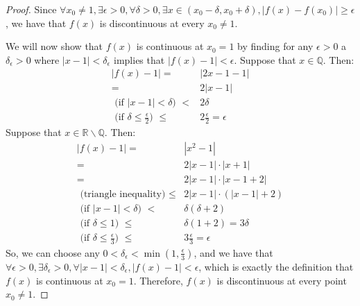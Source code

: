 \documentclass{article}
\newcommand{\reals}{\ensuremath{\mathbb{R}}}
\newcommand{\rats}{\ensuremath{\mathbb{Q}}}
\newcommand{\irats}{\ensuremath{\reals \backslash \rats}}
\newcommand{\eps}{\ensuremath{\epsilon}}
\newcommand{\pt}[1]{\textrm{ #1 }}
\begin{document}
\begin{proof}
	Since $\forall x_0 \neq 1,
	\exists \eps > 0,
	\forall \delta > 0,
	\exists x \in (x_0 - \delta, x_0 + \delta),
	|f(x) - f(x_0)| \geq \eps$,
	we have that $f(x)$
	is discontinuous
	at every $x_0 \neq 1$.

	We will now show that
	$f(x)$ is continuous at $x_0 = 1$
	by finding for any $\eps > 0$
	a $\delta_\eps > 0$
	where $|x - 1| < \delta_\eps$
	implies that $|f(x) - 1| < \eps$.
	Suppose that $x \in \rats$. Then:
	\begin{align}
		|f(x) - 1| = & |2x - 1 - 1| \\
			   = & 2|x - 1| \\
		\pt{(if $|x - 1| < \delta$)} < & 2\delta \\
		\pt{(if $\delta \le \frac{\eps}{2}$)} \le & 2 \frac{\eps}{2} = \eps
	\end{align}
	Suppose that $x \in \irats$. Then:
	\begin{align}
		|f(x) - 1| = & |x^2 - 1| \\
			   = & 2|x - 1| \cdot |x + 1| \\
			   = & 2|x - 1| \cdot |x - 1 + 2| \\
			   \pt{(triangle inequality)} \le & 2|x - 1| \cdot (|x - 1|+ 2) \\
			   \pt{(if $|x - 1| < \delta$)} < & \delta(\delta + 2) \\
			   \pt{(if $\delta \le 1$)} \le & \delta(1 + 2) = 3\delta \\
		\pt{(if $\delta \le \frac{\eps}{3}$)} \le & 3 \frac{\eps}{3} = \eps
	\end{align}
	So, we can choose any $0 < \delta_\eps < \min(1, \frac{\eps}{3})$,
	and we have that
	$\forall \eps > 0,
	\exists \delta_\eps > 0,
	\forall |x - 1| < \delta_\eps,
	|f(x) - 1| < \eps$,
	which is exactly the definition
	that $f(x)$ is continuous at $x_0 = 1$.
	Therefore,
	$f(x)$ is discontinuous at every point $x_0 \neq 1$.
\end{proof}
\end{document}
